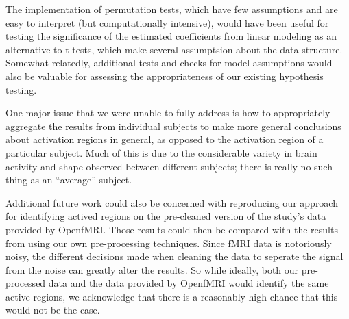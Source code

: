 \par \indent The implementation of permutation tests, which have few 
assumptions and are easy to interpret (but computationally intensive), 
would have been useful for testing the significance of the estimated 
coefficients from linear modeling as an alternative to t-tests, which make 
several assumptsion about the data structure. Somewhat relatedly, 
additional tests and checks for model assumptions would also be valuable 
for assessing the appropriateness of our existing hypothesis testing. 

\par One major issue that we were unable to fully address is how to 
appropriately aggregate the results from individual subjects to make more 
general conclusions about activation regions in general, as opposed to the 
activation region of a particular subject. Much of this is due to the 
considerable variety in brain activity and shape observed between different 
subjects; there is really no such thing as an ``average'' subject. 

\par Additional future work could also be concerned with reproducing our 
approach for identifying actived regions on the pre-cleaned version of the 
study's data provided by OpenfMRI. Those results could then be compared
with the results from using our own pre-processing techniques. Since fMRI 
data is notoriously noisy, the different decisions made when cleaning the 
data to seperate the signal from the noise can greatly alter the results. 
So while ideally, both our pre-processed data and the data provided by 
OpenfMRI would identify the same active regions, we acknowledge that there 
is a reasonably high chance that this would not be the case. 
